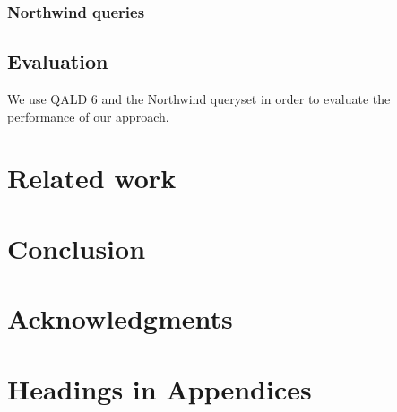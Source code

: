 \documentclass{sig-alternate-05-2015}
\begin{document}
\subsubsection{Northwind queries}
\subsection{Evaluation}
We use QALD 6 and the Northwind queryset in order to evaluate the performance of our approach.

\section{Related work}

\section{Conclusion}

\section{Acknowledgments}



\appendix

\section{Headings in Appendices}
\end{document}
